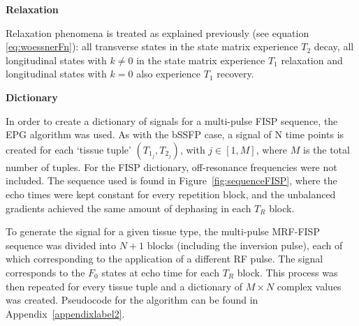 \hfill

\textbf{Relaxation}

Relaxation phenomena is treated as explained previously (see equation \ref{eq:woessnerFn}):
all transverse states in the state matrix experience $T_2$ decay, all longitudinal states with $k \neq 0$ in the state matrix experience $T_1$ relaxation and longitudinal states with $k = 0$ also experience $T_1$ recovery.

\hfill

\large \textbf{Dictionary} \normalsize

In order to create a dictionary of signals for a multi-pulse FISP sequence, the EPG algorithm was used.
As with the bSSFP case, a signal of N time points is created for each `tissue tuple'
$(T_{1_j}, T_{2_j})$, with $j \in [1, M]$, where $M$ is the total number of tuples.
For the FISP dictionary, off-resonance frequencies were not included.
The sequence used is found in Figure~\ref{fig:sequenceFISP}, where the echo times were kept constant for every repetition block, and the unbalanced gradients achieved the same amount of dephasing in each $T_R$ block.

\hfill

To generate the signal for a given tissue type, the multi-pulse MRF-FISP sequence was divided into $N+1$ blocks (including the inversion pulse), each of which corresponding to the application of a different RF pulse.
The signal corresponds to the $F_0$ states at echo time for each $T_R$ block.
This process was then repeated for every tissue tuple and a dictionary of $M \times N$ complex values was created.
Pseudocode for the algorithm can be found in Appendix~\ref{appendixlabel2}.

\hfill



